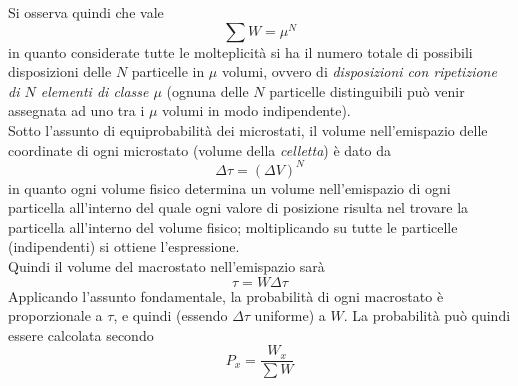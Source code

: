 \documentclass[10pt, oneside]{book}
\begin{document}
Si osserva quindi che vale
\[\sum W = \mu^N\]
in quanto considerate tutte le molteplicità si ha il numero totale di possibili disposizioni delle $N$ particelle in $\mu$ volumi, ovvero di \textit{disposizioni con ripetizione di $N$ elementi di classe $\mu$} (ognuna delle $N$ particelle distinguibili può venir assegnata ad uno tra i $\mu$ volumi in modo indipendente).\\
Sotto l'assunto di equiprobabilità dei microstati, il volume nell'emispazio delle coordinate di ogni microstato (volume della \textit{celletta}) è dato da 
\[\Delta \tau = (\Delta V)^N\]
in quanto ogni volume fisico determina un volume nell'emispazio di ogni particella all'interno del quale ogni valore di posizione risulta nel trovare la particella all'interno del volume fisico; moltiplicando su tutte le particelle (indipendenti) si ottiene l'espressione.\\
Quindi il volume del macrostato nell'emispazio sarà
\[\tau = W \Delta \tau\]
Applicando l'assunto fondamentale, la probabilità di ogni macrostato è proporzionale a $\tau$, e quindi (essendo $\Delta \tau$ uniforme) a $W$. La probabilità può quindi essere calcolata secondo
\[P_x = \frac{W_x}{\sum W}\]
\end{document}
